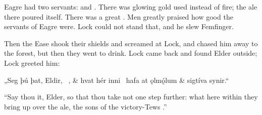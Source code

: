 Eagre had two servants:  and . There was glowing gold used instead of fire; the ale there poured itself. There was a great . Men greatly praised how good the servants of Eagre were. Lock could not stand that, and he slew Femfinger.

Then the Ease shook their shields and screamed at Lock, and chased him away to the forest, but then they went to drink. Lock came back and found Elder outside; Lock greeted him:\epb\epg

\sectionline

\bvg
\bva „Seg þú þat, Eldir, \hld\ , &
hvat hér inni \hld\ hafa at ǫlmǫ́lum &
\ind sigtíva synir.“\eva

\bvb “Say thou it, Elder, so that thou take not one step further: what here within they bring up over the ale, the sons of the victory-Tews .”\evb
\evg


